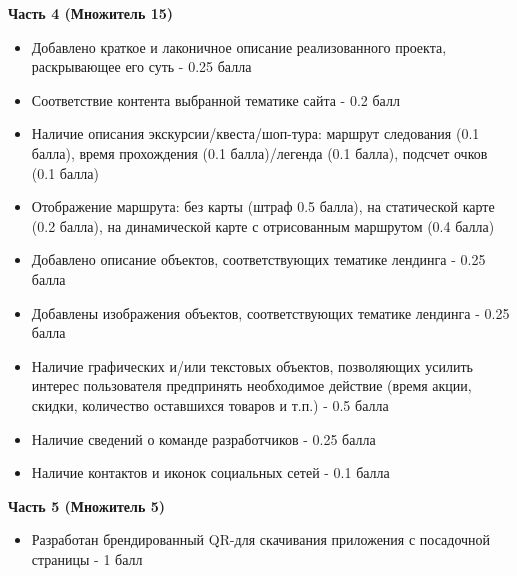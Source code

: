 \textbf{Часть 4 (Множитель 15)}
\begin{itemize}
    \item Добавлено краткое и лаконичное описание реализованного проекта, раскрывающее его суть - 0.25 балла
    \item Соответствие контента выбранной тематике сайта - 0.2 балл
    \item Наличие описания экскурсии/квеста/шоп-тура: маршрут следования (0.1 балла), время прохождения (0.1 балла)/легенда (0.1 балла), подсчет очков (0.1 балла)
    \item Отображение маршрута:  без карты (штраф 0.5 балла), на статической карте (0.2 балла), на динамической карте с отрисованным маршрутом (0.4 балла)
    \item Добавлено описание объектов, соответствующих тематике лендинга  - 0.25 балла
    \item Добавлены изображения объектов, соответствующих тематике лендинга - 0.25 балла
    \item Наличие графических и/или текстовых объектов, позволяющих усилить интерес пользователя предпринять необходимое действие (время акции, скидки, количество оставшихся товаров и т.п.) - 0.5 балла
    \item Наличие сведений о команде разработчиков - 0.25 балла
    \item Наличие контактов и иконок социальных сетей - 0.1 балла    
\end{itemize}

\textbf{Часть 5 (Множитель 5)}
\begin{itemize}
    \item Разработан брендированный QR-для скачивания приложения с посадочной страницы - 1 балл
\end{itemize}
